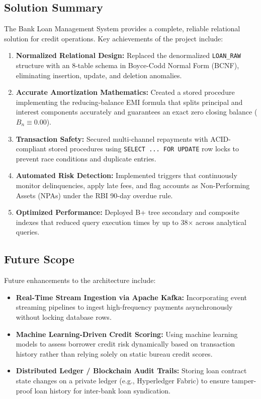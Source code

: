 \documentclass[11pt,a4paper]{report}
\begin{document}
\subsection{Solution Summary}
The Bank Loan Management System provides a complete, reliable relational solution for credit operations. Key achievements of the project include:
\begin{enumerate}
    \item \textbf{Normalized Relational Design:} Replaced the denormalized \texttt{LOAN\_RAW} structure with an 8-table schema in Boyce-Codd Normal Form (BCNF), eliminating insertion, update, and deletion anomalies.
    \item \textbf{Accurate Amortization Mathematics:} Created a stored procedure implementing the reducing-balance EMI formula that splits principal and interest components accurately and guarantees an exact zero closing balance ($B_n \equiv 0.00$).
    \item \textbf{Transaction Safety:} Secured multi-channel repayments with ACID-compliant stored procedures using \texttt{SELECT ... FOR UPDATE} row locks to prevent race conditions and duplicate entries.
    \item \textbf{Automated Risk Detection:} Implemented triggers that continuously monitor delinquencies, apply late fees, and flag accounts as Non-Performing Assets (NPAs) under the RBI 90-day overdue rule.
    \item \textbf{Optimized Performance:} Deployed B+ tree secondary and composite indexes that reduced query execution times by up to 38$\times$ across analytical queries.
\end{enumerate}

\subsection{Future Scope}
Future enhancements to the architecture include:
\begin{itemize}
    \item \textbf{Real-Time Stream Ingestion via Apache Kafka:} Incorporating event streaming pipelines to ingest high-frequency payments asynchronously without locking database rows.
    \item \textbf{Machine Learning-Driven Credit Scoring:} Using machine learning models to assess borrower credit risk dynamically based on transaction history rather than relying solely on static bureau credit scores.
    \item \textbf{Distributed Ledger / Blockchain Audit Trails:} Storing loan contract state changes on a private ledger (e.g., Hyperledger Fabric) to ensure tamper-proof loan history for inter-bank loan syndication.
\end{itemize}
\end{document}

